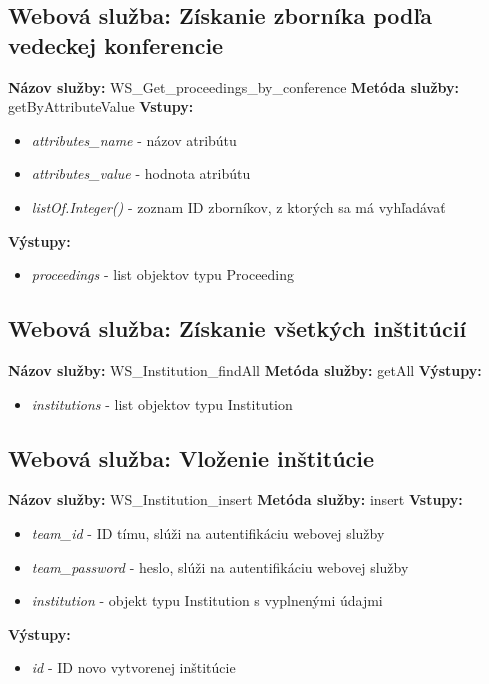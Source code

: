 \documentclass[10pt,oneside,slovak,a4paper]{article}
\begin{document}
\subsection{Webová služba: Získanie zborníka podľa vedeckej konferencie}
\textbf{Názov služby:} WS\_Get\_proceedings\_by\_conference
\textbf{Metóda služby:} getByAttributeValue
\textbf{Vstupy:}
	\begin{itemize}
		\item \textit{attributes\_name} - názov atribútu
		\item \textit{attributes\_value} - hodnota atribútu
		\item \textit{listOf.Integer()} - zoznam ID zborníkov, z ktorých sa má vyhľadávať
	\end{itemize}
\textbf{Výstupy:}
	\begin{itemize}
		\item \textit{proceedings} - list objektov typu Proceeding
	\end{itemize}
	
\subsection{Webová služba: Získanie všetkých inštitúcií}
\textbf{Názov služby:} WS\_Institution\_findAll
\textbf{Metóda služby:} getAll
\textbf{Výstupy:}
	\begin{itemize}
		\item \textit{institutions} - list objektov typu Institution
	\end{itemize}
	
\subsection{Webová služba: Vloženie inštitúcie}
\textbf{Názov služby:} WS\_Institution\_insert
\textbf{Metóda služby:} insert
\textbf{Vstupy:}
	\begin{itemize}
		\item \textit{team\_id} - ID tímu, slúži na autentifikáciu webovej služby
		\item \textit{team\_password} - heslo, slúži na autentifikáciu webovej služby
		\item \textit{institution} - objekt typu Institution s vyplnenými údajmi
	\end{itemize}
\textbf{Výstupy:}
	\begin{itemize}
		\item \textit{id} - ID novo vytvorenej inštitúcie
	\end{itemize}
	
\end{document}
